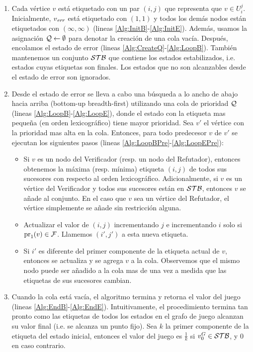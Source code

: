 \begin{enumerate}
  \item Cada vértice $v$ está etiquetado con un par $(i, j)$ que representa que $v \in U_{i}^{j}$. Inicialmente, $v_{\mathit{err}}$ está etiquetado con $(1, 1)$ y todos los demás nodos están etiquetados con $(\infty, \infty)$ (lineas \ref{Alg:InitB}-\ref{Alg:InitE}). 
  Además, usamos la asignación $\mathcal{Q} \gets \emptyset$ para denotar la creación de una cola vacía. 
  Después, encolamos el estado de error (lineas \ref{Alg:CreateQ}-\ref{Alg:LoopB}). También mantenemos un conjunto $\mathcal{STB}$ que contiene los estados estabilizados, i.e. estados cuyas etiquetas son finales. Los estados que no son alcanzables desde el estado de error son ignorados.
  \item Desde el estado de error se lleva a cabo una búsqueda a lo ancho de abajo hacia arriba (bottom-up breadth-first) utilizando una cola de prioridad $\mathcal{Q}$ (lineas \ref{Alg:LoopB}-\ref{Alg:LoopE}), donde el estado con la etiqueta mas pequeña (en orden lexicográfico) tiene mayor prioridad. 
  Sea $v'$ el vértice con la prioridad mas alta en la cola. Entonces, para todo predecesor $v$ de $v'$ se ejecutan los siguientes pasos (lineas \ref{Alg:LoopBPre}-\ref{Alg:LoopEPre}):
  \begin{itemize}
    \item Si $v$ es un nodo del Verificador (resp. un nodo del Refutador), entonces obtenemos la máxima (resp. mínima) etiqueta $(i,j)$ de todos sus sucesores con respecto al orden lexicográfico. Adicionalmente, si $v$ es un vértice del Verificador y todos sus sucesores están en $\mathcal{STB}$, entonces $v$ se añade al conjunto. En el caso que $v$ sea un vértice del Refutador, 
    el vértice simplemente se añade sin restricción alguna. 
    \item Actualizar el valor de $(i,j)$ incrementando $j$ e incrementando $i$ solo si $\operatorname{pr}_{1}(v) \in \mathcal{F}$. Llamemos $(i',j')$ a esta nueva etiqueta.
    \item Si $i'$ es diferente del primer componente de la etiqueta actual de $v$, entonces se actualiza y se agrega $v$ a la cola. 
    Observemos que el mismo nodo puede ser añadido a la cola mas de una vez a medida que las etiquetas de sus sucesores cambian.
  \end{itemize}
  \item Cuando la cola está vacía, 
  el algoritmo termina y retorna el valor del juego (lineas \ref{Alg:EndB}-\ref{Alg:EndE}). 
  Intuitivamente, el procedimiento termina tan pronto como las etiquetas de todos los estados en el grafo de juego alcanzan su valor final (i.e. se alcanza un punto fijo). 
  Sea $k$ la primer componente de la etiqueta del estado inicial, entonces el valor del juego es $\frac{1}{k}$ si 
  $v_0^G \in \mathcal{STB}$, y $0$ en caso contrario.\\
\end{enumerate}
